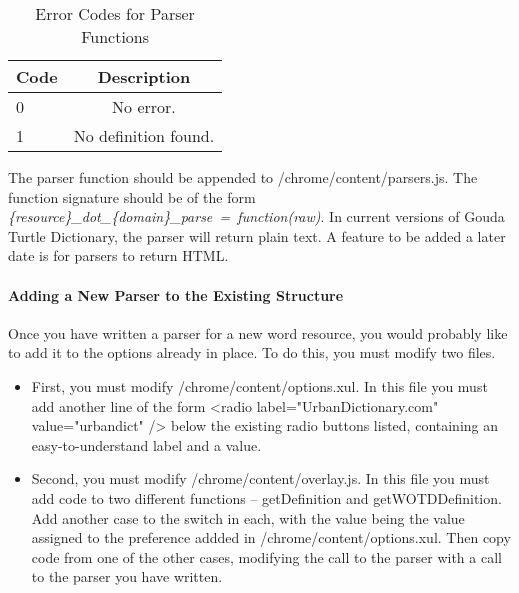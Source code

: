 \documentclass{article}
\begin{document}
\begin{table}
\centering
\caption{Error Codes for Parser Functions}
\label{tab:errors}
\begin{tabular}{|l|c|}
\hline
Code & Description\\
\hline
0 & No error.\\
\hline
1 & No definition found.\\
\hline
\end{tabular}
\end{table}

The parser function should be appended to /chrome/content/parsers.js. The
function signature should be of the form
\textit{\{resource\}\_dot\_\{domain\}\_parse~=~function(raw)}. In current
versions of Gouda Turtle Dictionary, the parser will return plain text. A
feature to be added a later date is for parsers to return HTML.

\paragraph{Adding a New Parser to the Existing Structure}

Once you have written a parser for a new word resource, you would probably like to add it to the options already in place. To do this, you must modify two files.

\begin{itemize}
\item First, you must modify /chrome/content/options.xul. In this file you must add another line of the form
<radio label="UrbanDictionary.com" value="urbandict"  /> below the existing radio buttons listed, containing an easy-to-understand label and a value.
\item Second, you must modify /chrome/content/overlay.js. In this file you must add code to two different functions -- getDefinition and getWOTDDefinition. Add another case to the switch in each, with the value being the value assigned to the preference addded in /chrome/content/options.xul. Then copy code from one of the other cases, modifying the call to the parser with a call to the parser you have written.
\end{itemize}
\end{document}
